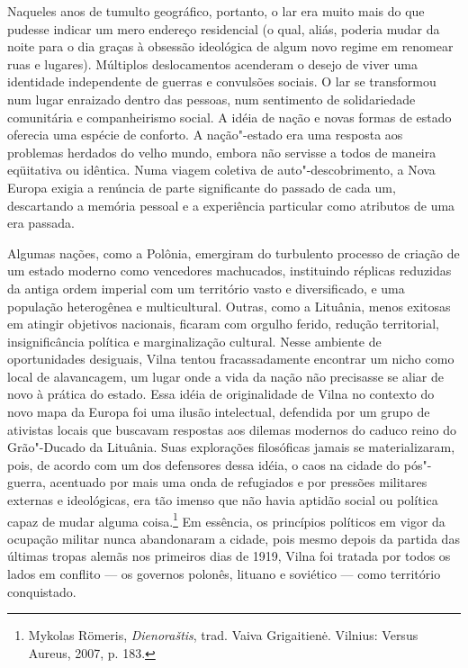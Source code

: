 Naqueles anos de tumulto geográfico, portanto, o lar era muito mais do
que pudesse indicar um mero endereço residencial (o qual, aliás, poderia
mudar da noite para o dia graças à obsessão ideológica de algum novo
regime em renomear ruas e lugares). Múltiplos deslocamentos acenderam o
desejo de viver uma identidade independente de guerras e convulsões
sociais. O lar se transformou num lugar enraizado dentro das pessoas,
num sentimento de solidariedade comunitária e companheirismo social. A
idéia de nação e novas formas de estado oferecia uma espécie de
conforto. A nação"-estado era uma resposta aos problemas herdados do
velho mundo, embora não servisse a todos de maneira eqüitativa ou
idêntica. Numa viagem coletiva de auto"-descobrimento, a Nova Europa
exigia a renúncia de parte significante do passado de cada um,
descartando a memória pessoal e a experiência particular como atributos
de uma era passada.

Algumas nações, como a Polônia, emergiram do turbulento processo de
criação de um estado moderno como vencedores machucados, instituindo
réplicas reduzidas da antiga ordem imperial com um território vasto e
diversificado, e uma população heterogênea e multicultural. Outras, como
a Lituânia, menos exitosas em atingir objetivos nacionais, ficaram com
orgulho ferido, redução territorial, insignificância política e
marginalização cultural. Nesse ambiente de oportunidades desiguais,
Vilna tentou fracassadamente encontrar um nicho como local de
alavancagem, um lugar onde a vida da nação não precisasse se aliar de
novo à prática do estado. Essa idéia de originalidade de Vilna no
contexto do novo mapa da Europa foi uma ilusão intelectual, defendida
por um grupo de ativistas locais que buscavam respostas aos dilemas
modernos do caduco reino do Grão"-Ducado da Lituânia. Suas explorações
filosóficas jamais se materializaram, pois, de acordo com um dos
defensores dessa idéia, o caos na cidade do pós"-guerra, acentuado por
mais uma onda de refugiados e por pressões militares externas e
ideológicas, era tão imenso que não havia aptidão social ou política
capaz de mudar alguma coisa.\footnote{Mykolas Römeris,
  \emph{Dienoraštis}, trad. Vaiva Grigaitienė. Vilnius: Versus Aureus,
  2007, p. 183.} Em essência, os princípios políticos em vigor da
ocupação militar nunca abandonaram a cidade, pois mesmo depois da
partida das últimas tropas alemãs nos primeiros dias de 1919, Vilna foi
tratada por todos os lados em conflito --- os governos polonês, lituano e
soviético --- como território conquistado.

